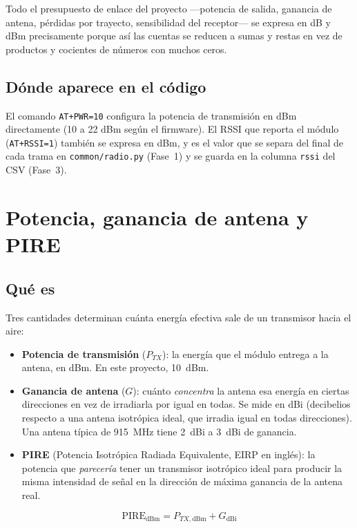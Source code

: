 Todo el presupuesto de enlace del proyecto —potencia de salida, ganancia de antena, pérdidas
por trayecto, sensibilidad del receptor— se expresa en dB y dBm precisamente porque así las
cuentas se reducen a sumas y restas en vez de productos y cocientes de números con muchos
ceros.

\section{Dónde aparece en el código}

El comando \texttt{AT+PWR=10} configura la potencia de transmisión en dBm directamente
(\num{10} a \num{22} dBm según el firmware). El RSSI que reporta el módulo
(\texttt{AT+RSSI=1}) también se expresa en dBm, y es el valor que se separa del final de cada
trama en \texttt{common/radio.py} (Fase~1) y se guarda en la columna \texttt{rssi} del CSV
(Fase~3).

\chapter{Potencia, ganancia de antena y PIRE}

\section{Qué es}

Tres cantidades determinan cuánta energía efectiva sale de un transmisor hacia el aire:

\begin{itemize}
  \item \textbf{Potencia de transmisión} ($P_{TX}$): la energía que el módulo entrega a la
    antena, en dBm. En este proyecto, \SI{10}{dBm}.
  \item \textbf{Ganancia de antena} ($G$): cuánto \emph{concentra} la antena esa energía en
    ciertas direcciones en vez de irradiarla por igual en todas. Se mide en dBi (decibelios
    respecto a una antena isotrópica ideal, que irradia igual en todas direcciones). Una antena
    típica de \SI{915}{MHz} tiene \SI{2}{dBi} a \SI{3}{dBi} de ganancia.
  \item \textbf{PIRE} (Potencia Isotrópica Radiada Equivalente, EIRP en inglés): la potencia
    que \emph{parecería} tener un transmisor isotrópico ideal para producir la misma intensidad
    de señal en la dirección de máxima ganancia de la antena real.
\end{itemize}

\begin{equation}
  \text{PIRE}_{\text{dBm}} = P_{TX,\text{dBm}} + G_{\text{dBi}}
  \label{eq:pire}
\end{equation}

